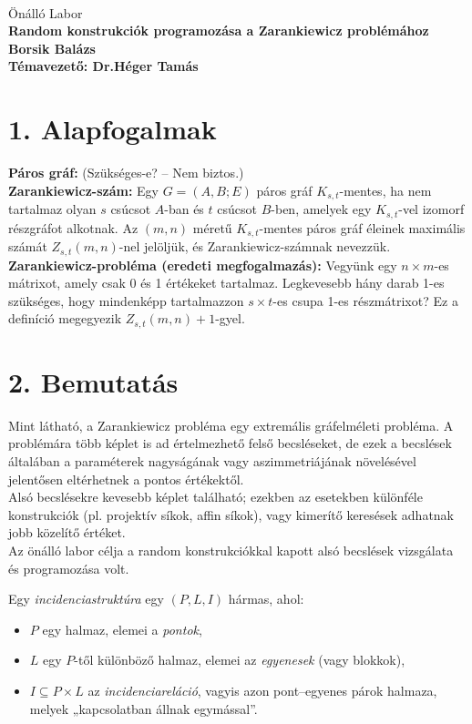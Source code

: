 \documentclass[12pt,a4paper]{article}
\begin{document}
 \ \
\vspace{2mm}
\begin{center}
{\Large\sc
Önálló Labor\\[5mm]
\bf 
Random konstrukciók programozása a Zarankiewicz problémához
\\[10mm]
{\Large
Borsik Balázs
}\\[10mm]
Témavezető: Dr.Héger Tamás
}
\end{center}
\vspace{1cm}

\section*{1. Alapfogalmak}
\textbf{Páros gráf:} (Szükséges-e? – Nem biztos.)\\[2mm]
\textbf{Zarankiewicz-szám:} Egy $G = (A,B;E)$ páros gráf $K_{s,t}$-mentes, ha nem tartalmaz olyan $s$ csúcsot $A$-ban és $t$ csúcsot $B$-ben, amelyek egy $K_{s,t}$-vel izomorf részgráfot alkotnak. Az $(m,n)$ méretű $K_{s,t}$-mentes páros gráf éleinek maximális számát $Z_{s,t}(m,n)$-nel jelöljük, és Zarankiewicz-számnak nevezzük.\\[2mm]
\textbf{Zarankiewicz-probléma (eredeti megfogalmazás):} Vegyünk egy $n \times m$-es mátrixot, amely csak 0 és 1 értékeket tartalmaz. Legkevesebb hány darab 1-es szükséges, hogy mindenképp tartalmazzon $s \times t$-es csupa 1-es részmátrixot? Ez a definíció megegyezik $Z_{s,t}(m,n) + 1$-gyel.
\section*{2. Bemutatás}
Mint látható, a Zarankiewicz probléma egy extremális gráfelméleti probléma. A problémára több képlet is ad értelmezhető felső becsléseket, de ezek a becslések általában a paraméterek nagyságának vagy aszimmetriájának növelésével jelentősen eltérhetnek a pontos értékektől.\\

Alsó becslésekre kevesebb képlet található; ezekben az esetekben különféle konstrukciók (pl. projektív síkok, affin síkok), vagy kimerítő keresések adhatnak jobb közelítő értéket.\\

Az önálló labor célja a random konstrukciókkal kapott alsó becslések vizsgálata és programozása volt.

Egy \emph{incidenciastruktúra} egy $(P, L, I)$ hármas, ahol:
\begin{itemize}[nosep]
  \item $P$ egy halmaz, elemei a \emph{pontok},
  \item $L$ egy $P$-től különböző halmaz, elemei az \emph{egyenesek} (vagy blokkok),
  \item $I \subseteq P \times L$ az \emph{incidenciareláció}, vagyis azon pont–egyenes párok halmaza, melyek „kapcsolatban állnak egymással”.
\end{itemize}
\end{document}
